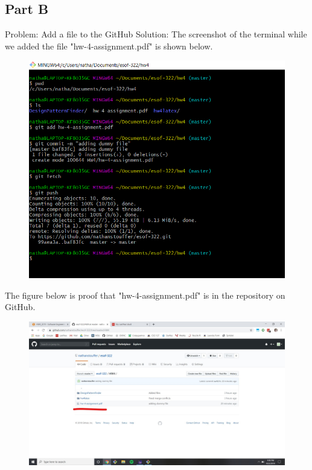 \documentclass{article}
\begin{document}
\subsection*{Part B}
Problem: Add a file to the GitHub
Solution: The screenshot of the terminal while we added the file "hw-4-assignment.pdf" is shown below.
\begin{figure}[h]
	\centering
	\includegraphics[width=5in]{dummy-file.jpg}
\end{figure}
\newpage
The figure below is proof that "hw-4-assignment.pdf" is in the repository on GitHub.
\begin{figure}[h]
	\centering
	\includegraphics[width=5in]{dummy-file-on-GitHub.jpg}
\end{figure}
\end{document}
